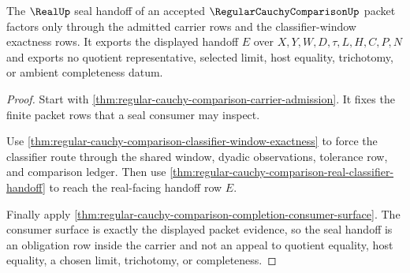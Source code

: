 \begin{theorem}
\label{thm:regular-cauchy-comparison-seal-handoff-obligation}
The $\RealUp$ seal handoff of an accepted $\RegularCauchyComparisonUp$ packet factors only through the admitted carrier rows and the classifier-window exactness rows. It exports the displayed handoff $E$ over $X,Y,W,D,\tau,L,H,C,P,N$ and exports no quotient representative, selected limit, host equality, trichotomy, or ambient completeness datum.
\end{theorem}
\begin{proof}
Start with \autoref{thm:regular-cauchy-comparison-carrier-admission}. It fixes the finite packet rows that a seal consumer may inspect.

Use \autoref{thm:regular-cauchy-comparison-classifier-window-exactness} to force the classifier route through the shared window, dyadic observations, tolerance row, and comparison ledger. Then use \autoref{thm:regular-cauchy-comparison-real-classifier-handoff} to reach the real-facing handoff row $E$.

Finally apply \autoref{thm:regular-cauchy-comparison-completion-consumer-surface}. The consumer surface is exactly the displayed packet evidence, so the seal handoff is an obligation row inside the carrier and not an appeal to quotient equality, host equality, a chosen limit, trichotomy, or completeness.
\end{proof}

